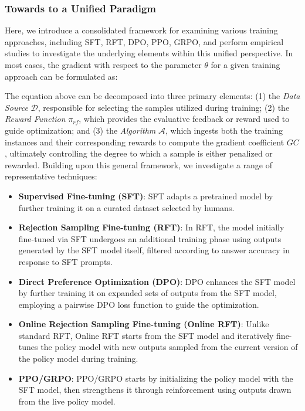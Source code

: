 \begin{itemize}[topsep=0pt]
\subsubsection{Towards to a Unified Paradigm} Here, we introduce a consolidated framework for examining various training approaches, including SFT, RFT, DPO, PPO, GRPO, and perform empirical studies to investigate the underlying elements within this unified perspective. In most cases, the gradient with respect to the parameter $\theta$ for a given training approach can be formulated as:

The equation above can be decomposed into three primary elements: (1) the \textit{Data Source} $\mathcal{D}$, responsible for selecting the samples utilized during training; (2) the \textit{Reward Function} $\pi_{{rf}}$, which provides the evaluative feedback or reward used to guide optimization; and (3) the \textit{Algorithm} $\mathcal{A}$, which ingests both the training instances and their corresponding rewards to compute the gradient coefficient $GC$, ultimately controlling the degree to which a sample is either penalized or rewarded. Building upon this general framework, we investigate a range of representative techniques:

\begin{itemize}
    \item  \textbf{Supervised Fine-tuning (SFT)}: SFT adapts a pretrained model by further training it on a curated dataset selected by humans.
    \item \textbf{Rejection Sampling Fine-tuning (RFT)}: In RFT, the model initially fine-tuned via SFT undergoes an additional training phase using outputs generated by the SFT model itself, filtered according to answer accuracy in response to SFT prompts.
    \item \textbf{Direct Preference Optimization (DPO)}: DPO enhances the SFT model by further training it on expanded sets of outputs from the SFT model, employing a pairwise DPO loss function to guide the optimization.
    \item \textbf{Online Rejection Sampling Fine-tuning (Online RFT)}: Unlike standard RFT, Online RFT starts from the SFT model and iteratively fine-tunes the policy model with new outputs sampled from the current version of the policy model during training.
    \item \textbf{PPO/GRPO}: PPO/GRPO starts by initializing the policy model with the SFT model, then strengthens it through reinforcement using outputs drawn from the live policy model.
\end{itemize}


\end{itemize}
